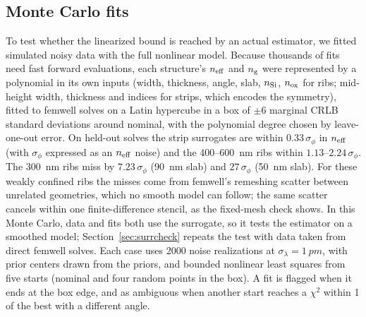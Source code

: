 \subsection{Monte Carlo fits}

To test whether the linearized bound is reached by an actual estimator, we fitted simulated noisy data with the full
nonlinear model. Because thousands of fits need fast forward evaluations, each structure's $n_\mathrm{eff}$ and $n_\mathrm{g}$ were
represented by a polynomial in its own inputs (width, thickness, angle, slab, $n_\mathrm{Si}$, $n_\mathrm{ox}$ for ribs; mid-height width,
thickness and indices for strips, which encodes the symmetry), fitted to femwell solves on a Latin hypercube in a box of
$\pm6$ marginal CRLB standard deviations around nominal, with the polynomial degree chosen by leave-one-out error. On
held-out solves the strip surrogates are within $0.33\,\sigma_\phi$ in $n_\mathrm{eff}$ (with $\sigma_\phi$ expressed as an
$n_\mathrm{eff}$ noise) and the 400--\qty{600}{nm} ribs within $1.13$--$2.24\,\sigma_\phi$. The \qty{300}{nm} ribs miss by
$7.23\,\sigma_\phi$ (\qty{90}{nm} slab) and $27\,\sigma_\phi$ (\qty{50}{nm} slab). For these weakly confined ribs the
misses come from femwell's remeshing scatter between unrelated geometries, which no smooth model can follow; the same
scatter cancels within one finite-difference stencil, as the fixed-mesh check shows. In this Monte Carlo, data and fits
both use the surrogate, so it tests the estimator on a smoothed model; Section~\ref{sec:surrcheck} repeats the test
with data taken from direct femwell solves. Each case uses 2000 noise realizations at
$\sigma_\lambda=\qty{1}{pm}$, with prior centers drawn from the priors, and bounded nonlinear least squares from five
starts (nominal and four random points in the box). A fit is flagged when it ends at the box edge, and as ambiguous when
another start reaches a $\chi^2$ within 1 of the best with a different angle.
